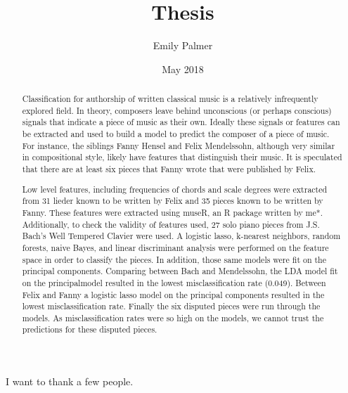 \documentclass[12pt,twoside]{reedthesis}
\title{Thesis}
\author{Emily Palmer}
\date{May 2018}
\theoremstyle{definition}
\theoremstyle{definition}
\theoremstyle{definition}
\theoremstyle{remark}
\begin{document}
  \maketitle

\frontmatter %
\pagestyle{empty} %
  \begin{acknowledgements}
    I want to thank a few people.
  \end{acknowledgements}

  \hypersetup{linkcolor=black}
  \setcounter{tocdepth}{2}
  \tableofcontents

  \listoftables

  \listoffigures
  \begin{abstract}
    Classification for authorship of written classical music is a relatively
    infrequently explored field. In theory, composers leave behind
    unconscious (or perhaps conscious) signals that indicate a piece of
    music as their own. Ideally these signals or features can be extracted
    and used to build a model to predict the composer of a piece of music.
    For instance, the siblings Fanny Hensel and Felix Mendelssohn, although
    very similar in compositional style, likely have features that
    distinguish their music. It is speculated that there are at least six
    pieces that Fanny wrote that were published by Felix.
    
    Low level features, including frequencies of chords and scale degrees
    were extracted from 31 lieder known to be written by Felix and 35 pieces
    known to be written by Fanny. These features were extracted using museR,
    an R package written by me*. Additionally, to check the validity of
    features used, 27 solo piano pieces from J.S. Bach's Well Tempered
    Clavier were used. A logistic lasso, k-nearest neighbors, random
    forests, naive Bayes, and linear discriminant analysis were performed on
    the feature space in order to classify the pieces. In addition, those
    same models were fit on the principal components. Comparing between Bach
    and Mendelssohn, the LDA model fit on the principalmodel resulted in the
    lowest misclassification rate (0.049). Between Felix and Fanny a
    logistic lasso model on the principal components resulted in the lowest
    misclassification rate. Finally the six disputed pieces were run through
    the models. As misclassification rates were so high on the models, we
    cannot trust the predictions for these disputed pieces.
  \end{abstract}
\end{document}
